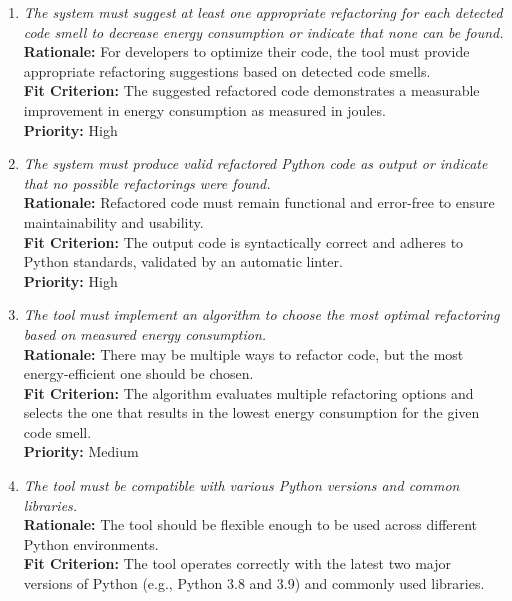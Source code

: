 \documentclass[12pt]{article}
\begin{document}
\begin{enumerate}[label=FR \arabic*., wide=0pt, leftmargin=*]
    {\bf Rationale:} Verifying that the refactored code preserves functionality requires the use of the original test suite.\\
    {\bf Fit Criterion:} Users can specify a path to their test suite that the tool recognizes and utilizes for testing the refactored code.\\
    {\bf Priority:} High
    \item \emph{The system must suggest at least one appropriate refactoring for each detected code smell to decrease energy consumption or indicate that none can be found.}\\
    {\bf Rationale:} For developers to optimize their code, the tool must provide appropriate refactoring suggestions based on detected code smells.\\
    {\bf Fit Criterion:} The suggested refactored code demonstrates a measurable improvement in energy consumption as measured in joules.\\
    {\bf Priority:} High
    \item \emph{The system must produce valid refactored Python code as output or indicate that no possible refactorings were found.}\\
    {\bf Rationale:} Refactored code must remain functional and error-free to ensure maintainability and usability.\\
    {\bf Fit Criterion:} The output code is syntactically correct and adheres to Python standards, validated by an automatic linter.\\
    {\bf Priority:} High
    \item \emph{The tool must implement an algorithm to choose the most optimal refactoring based on measured energy consumption.}\\
    {\bf Rationale:} There may be multiple ways to refactor code, but the most energy-efficient one should be chosen.\\
    {\bf Fit Criterion:} The algorithm evaluates multiple refactoring options and selects the one that results in the lowest energy consumption for the given code smell.\\
    {\bf Priority:} Medium
    \item \emph{The tool must be compatible with various Python versions and common libraries.}\\
    {\bf Rationale:} The tool should be flexible enough to be used across different Python environments.\\
    {\bf Fit Criterion:} The tool operates correctly with the latest two major versions of Python (e.g., Python 3.8 and 3.9) and commonly used libraries.\\

\end{enumerate}
\end{document}
